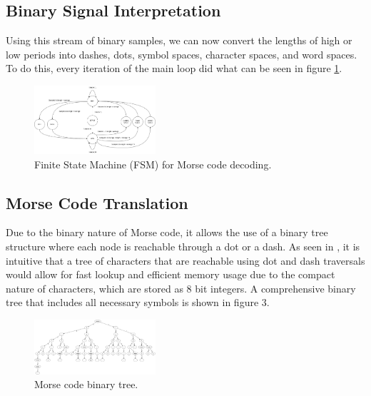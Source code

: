 \documentclass[head=13.6pt]{cce2014-design}
\begin{document}
\subsection{Binary Signal Interpretation}
Using this stream of binary samples, we can now convert the lengths of high or low periods into dashes, dots, symbol spaces, character spaces, and word spaces. To do this, every iteration of the main loop did what can be seen in figure \ref{FSM}.

\begin{figure}[tb]
    \centering
    \includegraphics[width=0.4\textwidth]{images/fsm.png}
    \caption{Finite State Machine (FSM) for Morse code decoding.}
    \label{FSM}
\end{figure}

\subsection{Morse Code Translation}
Due to the binary nature of Morse code, it allows the use of a binary tree structure where each node is reachable through a dot or a dash. As seen in \cite{itu}, it is intuitive that a tree of characters that are reachable using dot and dash traversals would allow for fast lookup and efficient memory usage due to the compact nature of characters, which are stored as 8 bit integers. A comprehensive binary tree that includes all necessary symbols is shown in figure 3.

\begin{figure}[tb]
    \centering
    \includegraphics[width=0.4\textwidth]{images/morse_tree.png}
    \caption{Morse code binary tree.}
    \label{morsetree}
\end{figure}
\end{document}
